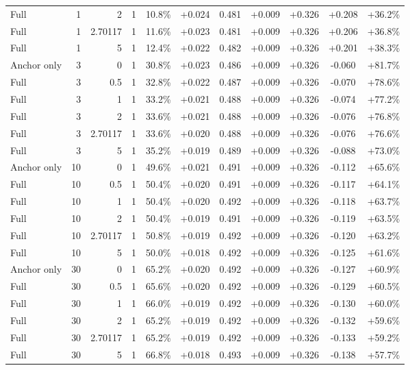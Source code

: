 \begin{table}[htbp]
\begin{tabular}{lrrrccccccc}
Full & 1 & 2 & 1 & 10.8\% & +0.024 & 0.481 & +0.009 & +0.326 & +0.208 & +36.2\% \\
Full & 1 & 2.70117 & 1 & 11.6\% & +0.023 & 0.481 & +0.009 & +0.326 & +0.206 & +36.8\% \\
Full & 1 & 5 & 1 & 12.4\% & +0.022 & 0.482 & +0.009 & +0.326 & +0.201 & +38.3\% \\
Anchor only & 3 & 0 & 1 & 30.8\% & +0.023 & 0.486 & +0.009 & +0.326 & -0.060 & +81.7\% \\
Full & 3 & 0.5 & 1 & 32.8\% & +0.022 & 0.487 & +0.009 & +0.326 & -0.070 & +78.6\% \\
Full & 3 & 1 & 1 & 33.2\% & +0.021 & 0.488 & +0.009 & +0.326 & -0.074 & +77.2\% \\
Full & 3 & 2 & 1 & 33.6\% & +0.021 & 0.488 & +0.009 & +0.326 & -0.076 & +76.8\% \\
Full & 3 & 2.70117 & 1 & 33.6\% & +0.020 & 0.488 & +0.009 & +0.326 & -0.076 & +76.6\% \\
Full & 3 & 5 & 1 & 35.2\% & +0.019 & 0.489 & +0.009 & +0.326 & -0.088 & +73.0\% \\
Anchor only & 10 & 0 & 1 & 49.6\% & +0.021 & 0.491 & +0.009 & +0.326 & -0.112 & +65.6\% \\
Full & 10 & 0.5 & 1 & 50.4\% & +0.020 & 0.491 & +0.009 & +0.326 & -0.117 & +64.1\% \\
Full & 10 & 1 & 1 & 50.4\% & +0.020 & 0.492 & +0.009 & +0.326 & -0.118 & +63.7\% \\
Full & 10 & 2 & 1 & 50.4\% & +0.019 & 0.491 & +0.009 & +0.326 & -0.119 & +63.5\% \\
Full & 10 & 2.70117 & 1 & 50.8\% & +0.019 & 0.492 & +0.009 & +0.326 & -0.120 & +63.2\% \\
Full & 10 & 5 & 1 & 50.0\% & +0.018 & 0.492 & +0.009 & +0.326 & -0.125 & +61.6\% \\
Anchor only & 30 & 0 & 1 & 65.2\% & +0.020 & 0.492 & +0.009 & +0.326 & -0.127 & +60.9\% \\
Full & 30 & 0.5 & 1 & 65.6\% & +0.020 & 0.492 & +0.009 & +0.326 & -0.129 & +60.5\% \\
Full & 30 & 1 & 1 & 66.0\% & +0.019 & 0.492 & +0.009 & +0.326 & -0.130 & +60.0\% \\
Full & 30 & 2 & 1 & 65.2\% & +0.019 & 0.492 & +0.009 & +0.326 & -0.132 & +59.6\% \\
Full & 30 & 2.70117 & 1 & 65.2\% & +0.019 & 0.492 & +0.009 & +0.326 & -0.133 & +59.2\% \\
Full & 30 & 5 & 1 & 66.8\% & +0.018 & 0.493 & +0.009 & +0.326 & -0.138 & +57.7\% \\

\end{tabular}
\end{table}
